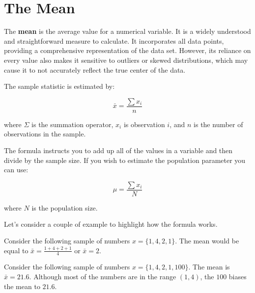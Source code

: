 \documentclass[
  11pt,
  letterpaper,
  DIV=11,
  numbers=noendperiod,
  oneside,
  open=any]{scrreprt}
\begin{document}
\section{The Mean}\label{the-mean}

The \textbf{mean} is the average value for a numerical variable. It is a
widely understood and straightforward measure to calculate. It
incorporates all data points, providing a comprehensive representation
of the data set. However, its reliance on every value also makes it
sensitive to outliers or skewed distributions, which may cause it to not
accurately reflect the true center of the data.

The sample statistic is estimated by:

\begin{bsformula}

\[\bar{x}=\frac{\sum x_{i}}{n}\]

where \(\Sigma\) is the summation operator, \(x_i\) is observation
\(i\), and \(n\) is the number of observations in the sample.

\end{bsformula}

The formula instructs you to add up all of the values in a variable and
then divide by the sample size. If you wish to estimate the population
parameter you can use:

\begin{bsformula}

\[\mu=\frac{\sum x_{i}}{N}\]

where \(N\) is the population size.

\end{bsformula}

Let's consider a couple of example to highlight how the formula works.

\begin{bsexample}[Example 1]

Consider the following sample of numbers \(x=\{1,4,2,1\}\). The mean
would be equal to \(\bar{x}=\frac{1+4+2+1}{4}\) or \(\bar{x}=2\).

\end{bsexample}

\begin{bsexample}[Example 2]

Consider the following sample of numbers \(x=\{1,4,2,1,100\}\). The mean
is \(\bar{x}=21.6\). Although most of the numbers are in the range
\((1,4)\), the \(100\) biases the mean to \(21.6\).

\end{bsexample}
\end{document}
